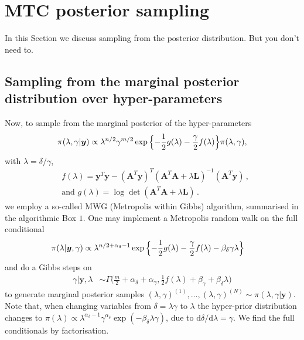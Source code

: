 \section{MTC posterior sampling}
\label{sec:postsamp}
In this Section we discuss sampling from the posterior distribution. But you don't need to.
\subsection{Sampling from the marginal posterior distribution over hyper-parameters}
Now, to sample from the marginal posterior of the hyper-parameters
\begin{align}
	\pi(\lambda, \gamma | \bm{y})
	\propto  \lambda^{n/2} \gamma^{m/2}   \exp{ \Bigl\{ - \frac{1}{2} g ( \lambda) - \frac{\gamma}{2} f ( \lambda) \Bigr\} } \pi(\lambda, \gamma),
	\label{eq:MargPostAppl}
\end{align}
with $\lambda = \delta / \gamma$,
\begin{subequations}
	\label{eq:fandg}
	\begin{align}
		&f ( \lambda) = \bm{y}^T \bm{y} - (\bm{A}^T \bm{y})^T (\bm{A}^T  \bm{A} + \lambda \bm{L})^{-1} (\bm{A}^T \bm{y})  \, ,  \\
		&\text{and } g(\lambda) = \log \det (\bm{A}^T  \bm{A} + \lambda \bm{L}) \,.
	\end{align}
\end{subequations}
we employ a so-called MWG (Metropolis within Gibbs) algorithm, summarised in the algorithmic Box $1$.
One may implement a Metropolis random walk on the full conditional
\begin{align}
	\label{eq:lamCondPrior}
	\pi(\lambda | \bm{y}, \gamma) &\propto \lambda^{n/2+\alpha_\delta -1} \exp{\Bigl\{ - \frac{1}{2} g ( \lambda) - \frac{\gamma}{2} f ( \lambda) - \beta_\delta \gamma \lambda \Bigr\}} 
\end{align} 
and do a Gibbs steps on
\begin{align}
	\gamma |  \bm{y}, \lambda &\sim \Gamma \bigg( \frac{m}{2} + \alpha_\delta + \alpha_\gamma, \frac{1}{2} f (\lambda ) + \beta_\gamma + \beta_\delta \lambda \bigg)\label{eq:gamCondPrior}
\end{align} 
to generate marginal posterior samples $(\lambda, \gamma)^{(1)}, \dots, (\lambda, \gamma)^{(N)} \sim  \pi(\lambda, \gamma| \bm{y})$.
Note that, when changing variables from $\delta = \lambda \gamma$ to $\lambda$ the hyper-prior distribution changes to $\pi(\lambda) \propto \lambda^{\alpha_\delta-1} \gamma^{\alpha_\delta} \exp{(- \beta_\delta \lambda  \gamma)} $, due to $\text{d}\delta / \text{d} \lambda = \gamma$.
We find the full conditionals by factorisation.



